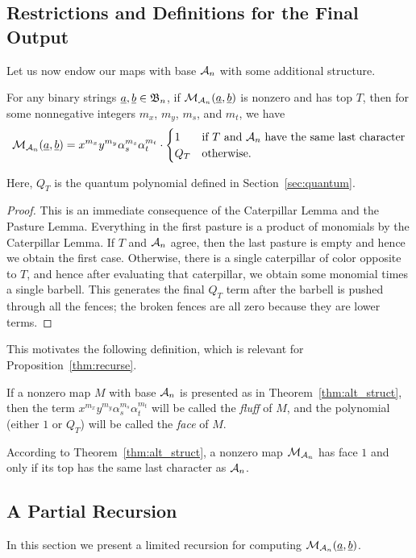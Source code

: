\subsection{Restrictions and Definitions for the Final Output}
Let us now endow our maps with base $\AA_n$ with some additional structure.
\begin{theorem}
	For any binary strings $\ul a, \ul b \in \BB_n$, if $\MM_{\AA_n} (\ul a, \ul b)$ is nonzero and has top $T$, then for some nonnegative integers $m_x$, $m_y$, $m_s$, and $m_t$, we have 
	\[
		\MM_{\AA_n} (\ul a, \ul b) =
		x^{m_x}y^{m_y}\alpha_s^{m_s}\alpha_t^{m_t} \cdot
		\begin{cases}
			1 & \text{if $T$ and $\AA_n$ have the same last character} \\
			Q_T & \text{otherwise}.
		\end{cases}
	\]
	\label{thm:alt_struct}
\end{theorem}
Here, $Q_T$ is the quantum polynomial defined in Section~\ref{sec:quantum}.
\begin{proof}
	This is an immediate consequence of the Caterpillar Lemma and the Pasture Lemma.  Everything in the first pasture is a product of monomials by the Caterpillar Lemma.  If $T$ and $\AA_n$ agree, then the last pasture is empty and hence we obtain the first case.  Otherwise, there is a single caterpillar of color opposite to $T$, and hence after evaluating that caterpillar, we obtain some monomial times a single barbell.  This generates the final $Q_T$ term after the barbell is pushed through all the fences; the broken fences are all zero because they are lower terms.
\end{proof}

This motivates the following definition, which is relevant for Proposition~\ref{thm:recurse}.
\begin{definition}
	If a nonzero map $M$ with base $\AA_n$ is presented as in Theorem~\ref{thm:alt_struct}, then the term $x^{m_x}y^{m_y}\alpha_s^{m_s}\alpha_t^{m_t}$ will be called the \emph{fluff} of $M$, and the polynomial (either $1$ or $Q_T$) will be called the \emph{face} of $M$. 
\end{definition}
\begin{remark*}
	According to Theorem~\ref{thm:alt_struct}, a nonzero map $\MM_{\AA_n}$ has face $1$ and only if its top has the same last character as $\AA_n$.
\end{remark*}

\subsection{A Partial Recursion}
In this section we present a limited recursion for computing $\MM_{\AA_n}(\ul a, \ul b)$.  

